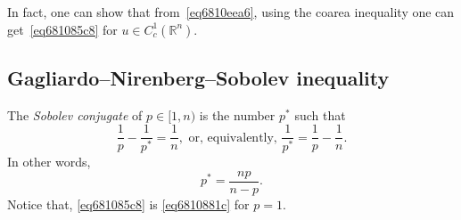 \documentclass[a4paper,9pt]{amsart}
\newcommand{\R}{\mathbb{R}}	%
\theoremstyle{plain}
\theoremstyle{definition}
\theoremstyle{remark}
\begin{document}
In fact, one can show that from~\eqref{eq6810eea6}, using the coarea inequality one can get~\eqref{eq681085c8} for $u\in C^1_c(\R^n)$.



\subsection{Gagliardo–Nirenberg–Sobolev inequality}\label{subs6895bd8f}

The \emph{Sobolev conjugate} of $p\in[1,n)$ is the number $p^*$ such that
\begin{equation}
	\frac{1}{p} - \frac{1}{p^*} = \frac{1}{n} ,
	\text{ or, equivalently, }
	 \frac{1}{p^*} = \frac{1}{p} - \frac{1}{n} .
\end{equation}
In other words,
\begin{equation}
	p^* = \frac{np}{n-p} .
\end{equation}
Notice that, \eqref{eq681085c8} is \eqref{eq6810881c} for $p=1$.
\end{document}
